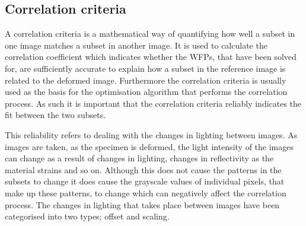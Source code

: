 \documentclass[12pt,oneside,openany,a4paper, %
english, %
masters-t, goldenblock]{usthesis}
\newcommand*\mean[1]{\bar{#1}} %
\begin{document}

\subsection{Correlation criteria}
A correlation criteria is a mathematical way of quantifying how well a subset in one image matches a subset in another image. It is used to calculate the correlation coefficient which indicates whether the WFPs, that have been solved for, are sufficiently accurate to explain how a subset in the reference image is related to the deformed image. Furthermore the correlation criteria is usually used as the basis for the optimisation algorithm that performs the correlation process.
As such it is important that the correlation criteria reliably indicates the fit between the two subsets.

This reliability refers to dealing with the changes in lighting between images. As images are taken, as the specimen is deformed, the light intensity of the images can change as a result of changes in lighting, changes in reflectivity as the material strains and so on. Although this does not cause the patterns in the subsets to change it does cause the grayscale values of individual pixels, that make up these patterns, to change which can negatively affect the correlation process. The changes in lighting that takes place between images have been categorised into two types; offset and scaling. 


\end{document}
